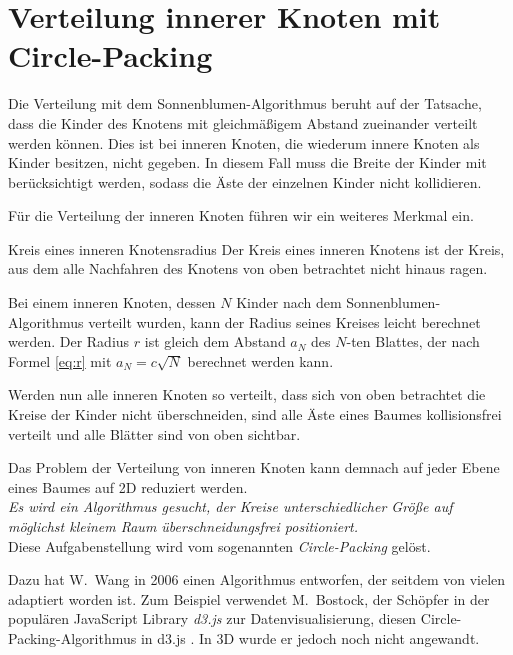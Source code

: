 \section{Verteilung innerer Knoten mit Circle-Packing}
\label{sec:Circle-Packing}

Die Verteilung mit dem Sonnenblumen-Algorithmus beruht auf der Tatsache, dass die Kinder des Knotens mit gleichmäßigem Abstand zueinander verteilt werden können. Dies ist bei inneren Knoten, die wiederum innere Knoten als Kinder besitzen, nicht gegeben. In diesem Fall muss die Breite der Kinder mit berücksichtigt werden, sodass die Äste der einzelnen Kinder nicht kollidieren.

Für die Verteilung der inneren Knoten führen wir ein weiteres Merkmal ein.

\begin{defbox}{Kreis eines inneren Knotens}{radius}
   Der Kreis eines inneren Knotens ist der Kreis, aus dem alle Nachfahren des Knotens von oben betrachtet nicht hinaus ragen.
\end{defbox}

Bei einem inneren Knoten, dessen $N$ Kinder nach dem Sonnenblumen-Algorithmus verteilt wurden, kann der Radius seines Kreises leicht berechnet werden. Der Radius $r$ ist gleich dem Abstand $a_N$ des $N$-ten Blattes, der nach Formel \ref{eq:r} mit $a_N = c \sqrt{N}$ berechnet werden kann.

Werden nun alle inneren Knoten so verteilt, dass sich von oben betrachtet die Kreise der Kinder nicht überschneiden, sind alle Äste eines Baumes kollisionsfrei verteilt und alle Blätter sind von oben sichtbar.

Das Problem der Verteilung von inneren Knoten kann demnach auf jeder Ebene eines Baumes auf 2D reduziert werden.\\

\textit{Es wird ein Algorithmus gesucht, der Kreise unterschiedlicher Größe auf möglichst kleinem Raum überschneidungsfrei positioniert.}\\

Diese Aufgabenstellung wird vom sogenannten \textit{Circle-Packing} gelöst.

Dazu hat W.\ Wang in \cite{wang2006visualization} 2006 einen Algorithmus entworfen, der seitdem von vielen adaptiert worden ist. Zum Beispiel verwendet M.\ Bostock, der Schöpfer in der populären JavaScript Library \textit{d3.js} zur Datenvisualisierung, diesen Circle-Packing-Algorithmus in d3.js \cite{bostock2017abetter}. In 3D wurde er jedoch noch nicht angewandt.

